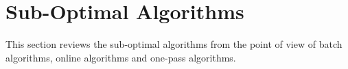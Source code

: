 \newtheorem{theorem}{Theorem}
\newtheorem{lemma}{Lemma}

\section{Sub-Optimal Algorithms}
\label{sec-subopt}



This section reviews the sub-optimal \lsa algorithms from the point of view of batch algorithms, online algorithms and one-pass algorithms.









